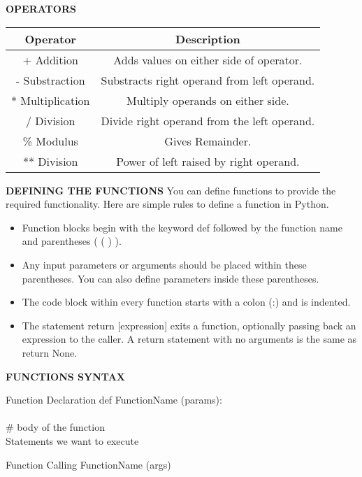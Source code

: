 \documentclass{beamer}
\begin{document}
\begin{darkframes}
    \begin{frame}{\textbf{OPERATORS}}
    \begin{tabular}{|c|c|}
    \hline 
    \textbf{Operator} & \textbf{Description} \\
    \hline
    + Addition & Adds values on either side of operator.\\
    \hline
    - Substraction & Substracts right operand from left operand.\\
    \hline 
    * Multiplication & Multiply operands on either side.\\
    \hline 
    / Division & Divide right operand from the left operand.\\
    \hline 
    \% Modulus & Gives Remainder.\\
    \hline 
    ** Division & Power of left raised by right operand.\\
    \hline
    \end{tabular}
    \end{frame}
    
    \begin{frame}{\textbf{DEFINING THE FUNCTIONS}}
    You can define functions to provide the required functionality. Here are simple rules to define a function in Python.
    \begin{itemize}
        \item Function blocks begin with the keyword def followed by the function name and parentheses ( ( ) ).
        \item Any input parameters or arguments should be placed within these parentheses. You can also define parameters inside these parentheses.
        \item The code block within every function starts with a colon (:) and is indented.
        \item The statement return [expression] exits a function, optionally passing back an expression to the caller. A return statement with no arguments is the same as return None.
    \end{itemize}
    \end{frame}
    
    \begin{frame}{\textbf{FUNCTIONS SYNTAX}}
        \begin{block}{Function Declaration}
      def FunctionName (params):\\
        \\\quad  \# body of the function
        \\ \quad Statements we want to execute\\
    \end{block}
    \begin{block}{Function Calling}
      FunctionName (args)\\
    \end{block}
    \end{frame}
    

\end{darkframes}
\end{document}
